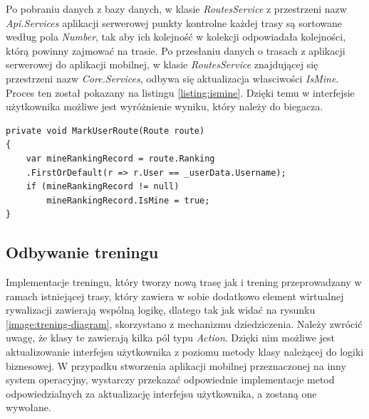 Po pobraniu danych z bazy danych, w klasie \textit{RoutesService} z przestrzeni nazw \textit{Api.Services} aplikacji serwerowej punkty kontrolne każdej trasy są sortowane według pola \textit{Number}, tak aby ich kolejność w kolekcji odpowiadała kolejności, którą powinny zajmować na trasie. Po przesłaniu danych o trasach z aplikacji serwerowej do aplikacji mobilnej, w klasie \textit{RoutesService} znajdującej się przestrzeni nazw \textit{Core.Services}, odbywa się aktualizacja własciwości \textit{IsMine}. Proces ten został pokazany na listingu \ref{listing:ismine}. Dzięki temu w interfejsie użytkownika możliwe jest wyróżnienie wyniku, który należy do biegacza.
\begin{lstlisting}[caption={Aktualizacja właściwości IsMine klasy Route},label=listing:ismine]
private void MarkUserRoute(Route route)
{
	var mineRankingRecord = route.Ranking
	.FirstOrDefault(r => r.User == _userData.Username);
	if (mineRankingRecord != null)
		mineRankingRecord.IsMine = true;
}
\end{lstlisting}

\subsection{Odbywanie treningu}
Implementacje treningu, który tworzy nową trasę jak i trening przeprowadzany w ramach istniejącej trasy, który zawiera w sobie dodatkowo element wirtualnej rywalizacji zawierają wspólną logikę, dlatego tak jak widać na rysunku \ref{image:trening-diagram}, skorzystano z mechanizmu dziedziczenia. Należy zwrócić uwagę, że klasy te zawierają kilka pól typu \textit{Action}. Dzięki nim możliwe jest aktualizowanie interfejsu użytkownika z poziomu metody klasy należącej do logiki biznesowej. W przypadku stworzenia aplikacji mobilnej przeznaczonej na inny system operacyjny, wystarczy przekazać odpowiednie implementacje metod odpowiedzialnych za aktualizację interfejsu użytkownika, a zostaną one wywołane. 


